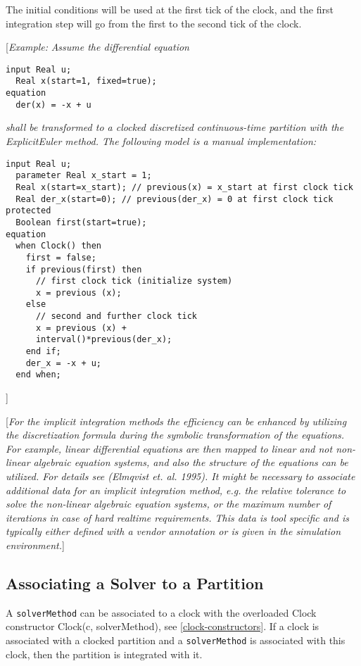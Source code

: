 The initial conditions will be used at the first tick of the clock, and
the first integration step will go from the first to the second tick of
the clock.

{[}\emph{Example:}
\emph{Assume the differential equation}
\begin{lstlisting}[language=modelica]
  input Real u;
  Real x(start=1, fixed=true);
equation
  der(x) = -x + u
\end{lstlisting}
\emph{shall be transformed to a clocked discretized continuous-time
partition with the ExplicitEuler method. The following model is a manual
implementation:}

\begin{lstlisting}[language=modelica]
  input Real u;
  parameter Real x_start = 1;
  Real x(start=x_start); // previous(x) = x_start at first clock tick
  Real der_x(start=0); // previous(der_x) = 0 at first clock tick
protected 
  Boolean first(start=true);
equation 
  when Clock() then
    first = false;
    if previous(first) then
      // first clock tick (initialize system)
      x = previous (x);
    else
      // second and further clock tick
      x = previous (x) +
      interval()*previous(der_x);
    end if;
    der_x = -x + u;
  end when;
\end{lstlisting}
{]}

{[}\emph{For the implicit integration methods the efficiency can be
enhanced by utilizing the discretization formula during the symbolic
transformation of the equations. For example, linear differential
equations are then mapped to linear and not non-linear algebraic
equation systems, and also the structure of the equations can be
utilized. For details see (Elmqvist et. al. 1995). It might be necessary
to associate additional data for an implicit integration method, e.g.
the relative tolerance to solve the non-linear algebraic equation
systems, or the maximum number of iterations in case of hard realtime
requirements. This data is tool specific and is typically either defined
with a vendor annotation or is given in the simulation environment.}{]}

\subsection{Associating a Solver to a Partition}

A \lstinline[basicstyle=\ttfamily]!solverMethod! can be associated to a clock with the overloaded Clock
constructor Clock(c, solverMethod), see \autoref{clock-constructors}. If a clock is
associated with a clocked partition and a \lstinline[basicstyle=\ttfamily]!solverMethod! is associated
with this clock, then the partition is integrated with it.

